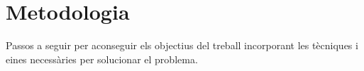 \chapter{Metodologia}

Passos a seguir per aconseguir els objectius del treball incorporant les tècniques i eines necessàries per solucionar el problema.